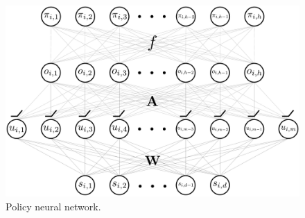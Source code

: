 \begin{figure}[t]
\vskip 0.2in
\begin{center}
\centerline{\includegraphics[width=\columnwidth]{nn_policy.pdf}}
\caption{Policy neural network.}
\label{fig:nn_policy}
\end{center}
\vskip -0.2in
\end{figure}




